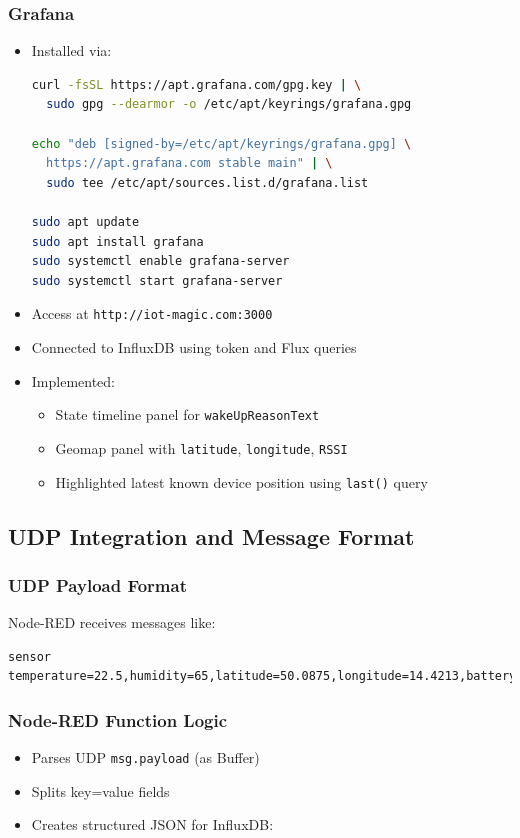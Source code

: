 \documentclass[11pt,a4paper]{article}
\begin{document}
\subsubsection*{Grafana}
\begin{itemize}
  \item Installed via:
  \begin{lstlisting}[language=bash]
curl -fsSL https://apt.grafana.com/gpg.key | \
  sudo gpg --dearmor -o /etc/apt/keyrings/grafana.gpg

echo "deb [signed-by=/etc/apt/keyrings/grafana.gpg] \
  https://apt.grafana.com stable main" | \
  sudo tee /etc/apt/sources.list.d/grafana.list

sudo apt update
sudo apt install grafana
sudo systemctl enable grafana-server
sudo systemctl start grafana-server
\end{lstlisting}
  \item Access at \texttt{http://iot-magic.com:3000}
  \item Connected to InfluxDB using token and Flux queries
  \item Implemented:
    \begin{itemize}
      \item State timeline panel for \texttt{wakeUpReasonText}
      \item Geomap panel with \texttt{latitude}, \texttt{longitude}, \texttt{RSSI}
      \item Highlighted latest known device position using \texttt{last()} query
    \end{itemize}
\end{itemize}

\subsection*{UDP Integration and Message Format}

\subsubsection*{UDP Payload Format}
Node-RED receives messages like:
\begin{lstlisting}
sensor temperature=22.5,humidity=65,latitude=50.0875,longitude=14.4213,battery=89
\end{lstlisting}

\subsubsection*{Node-RED Function Logic}
\begin{itemize}
  \item Parses UDP \texttt{msg.payload} (as Buffer)
  \item Splits key=value fields
  \item Creates structured JSON for InfluxDB:
\end{itemize}
\end{document}
